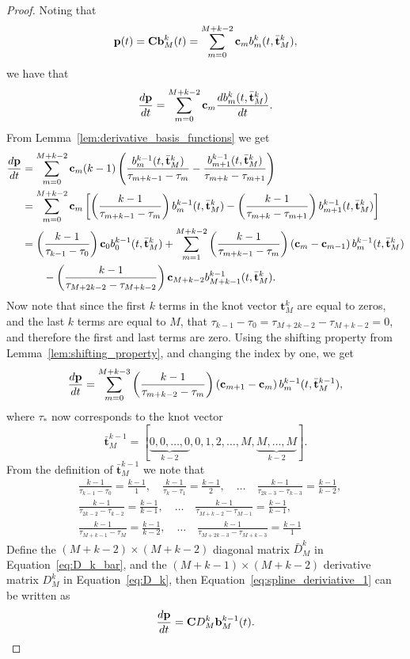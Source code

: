 \begin{proof}
Noting that
\[
\mathbf{p}(t) = \mathbf{C} \mathbf{b}_M^k(t)
              = \sum_{m=0}^{M+k-2} \mathbf{c}_m b_m^k(t,  \bar{\mathbf{t}}_M^k),
\]
we have that
\[
\frac{d\mathbf{p}}{dt} = \sum_{m=0}^{M+k-2} \mathbf{c}_m \frac{d b_m^k(t,  \bar{\mathbf{t}}_M^k)}{dt}.
\]
From Lemma~\ref{lem:derivative_basis_functions} we get
\begin{align*}
\frac{d\mathbf{p}}{dt} &= \sum_{m=0}^{M+k-2} \mathbf{c}_m (k-1)\left(\frac{b_m^{k-1}(t,  \bar{\mathbf{t}}_M^k)}{\tau_{m+k-1}-\tau_m} - \frac{b_{m+1}^{k-1}(t,  \bar{\mathbf{t}}_M^k)}{\tau_{m+k}-\tau_{m+1}} \right) \\
&= \sum_{m=0}^{M+k-2} \mathbf{c}_m \left[ \left(\frac{k-1}{\tau_{m+k-1}-\tau_m}\right) b_m^{k-1}(t,  \bar{\mathbf{t}}_M^k) - \left(\frac{k-1}{\tau_{m+k}-\tau_{m+1}}\right)  b_{m+1}^{k-1}(t,  \bar{\mathbf{t}}_M^k) \right] \\
&= \left(\frac{k-1}{\tau_{k-1}-\tau_0}\right)\mathbf{c}_0 b_0^{k-1}(t,  \bar{\mathbf{t}}_M^k) + \sum_{m=1}^{M+k-2} \left(\frac{k-1}{\tau_{m+k-1}-\tau_m}\right) \left(  \mathbf{c}_m - \mathbf{c}_{m-1}  \right) b_m^{k-1}(t,  \bar{\mathbf{t}}_M^k) \\
&\qquad - \left(\frac{k-1}{\tau_{M+2k-2}-\tau_{M+k-2}}\right)\mathbf{c}_{M+k-2}b_{M+k-1}^{k-1}(t,  \bar{\mathbf{t}}_M^k).
\end{align*}
Now note that since the first $k$ terms in the knot vector $\mathbf{t}_M^k$ are equal to zeros, and the last $k$ terms are equal to $M$, that $\tau_{k-1}-\tau_0 = \tau_{M+2k-2}-\tau_{M+k-2} = 0$, and therefore the first and last terms are zero.  Using the shifting property from Lemma~\ref{lem:shifting_property}, and changing the index by one, we get
\begin{equation}\label{eq:spline_deriviative_1}
\frac{d\mathbf{p}}{dt} = \sum_{m=0}^{M+k-3} \left(\frac{k-1}{\tau_{m+k-2}-\tau_{m}}\right) \left( \cbf_{m+1} - \cbf_{m}  \right) b_{m}^{k-1}(t,  \bar{\mathbf{t}}_M^{k-1}),
\end{equation}
where $\tau_\ast$ now corresponds to the knot vector 
\[
\bar{\mathbf{t}}_M^{k-1} = [\underbrace{0, 0, \dots, 0}_{k-2}, 0, 1, 2, \dots, M, \underbrace{M, \dots, M}_{k-2}].
\]
From the definition of $\bar{\mathbf{t}}_M^{k-1}$ we note that
\begin{align*}
& \frac{k-1}{\tau_{k-1}-\tau_0} = \frac{k-1}{1}, \quad
\frac{k-1}{\tau_{k}-\tau_1} = \frac{k-1}{2}, \quad
\dots \quad
\frac{k-1}{\tau_{2k-3}-\tau_{k-3}} = \frac{k-1}{k-2},  \\
&\frac{k-1}{\tau_{2k-2}-\tau_{k-2}} = \frac{k-1}{k-1}, \quad
\dots \quad
\frac{k-1}{\tau_{M+k-2} - \tau_{M-1}} = \frac{k-1}{k-1}, \\
& \frac{k-1}{\tau_{M+k-1} - \tau_{M}} = \frac{k-1}{k-2}, \quad
\dots \quad
\frac{k-1}{\tau_{M+2k-3} - \tau_{M+k-3}} = \frac{k-1}{1}
\end{align*}
Define the $(M+k-2)\times(M+k-2)$ diagonal matrix $\bar{D}_M^k$ in Equation~\eqref{eq:D_k_bar}, and the $(M+k-1)\times (M+k-2)$ derivative matrix $D_M^k$ in Equation~\eqref{eq:D_k},
then Equation~\eqref{eq:spline_deriviative_1} can be written as
\[
\frac{d\mathbf{p}}{dt} = \mathbf{C} D_M^k \mathbf{b}_M^{k-1}(t).
\]
\end{proof}

